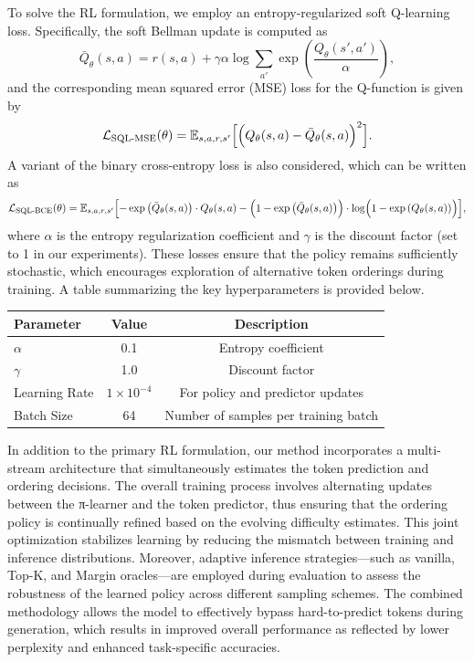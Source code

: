 \documentclass{article}
\begin{document}
To solve the RL formulation, we employ an entropy-regularized soft Q-learning loss. Specifically, the soft Bellman update is computed as
\[
\bar{Q}_\theta(s, a) = r(s, a) + \gamma \alpha \log \sum_{a'} \exp\left(\frac{Q_\theta(s',a')}{\alpha}\right),
\]
and the corresponding mean squared error (MSE) loss for the Q-function is given by
\[
\mathcal{L}_{\text{SQL-MSE}}(\theta) = \mathbb{E}_{s,a,r,s'} \Bigl[\Bigl(Q_\theta(s,a) - \bar{Q}_\theta(s,a)\Bigr)^2\Bigr].
\]
A variant of the binary cross-entropy loss is also considered, which can be written as
\[
\mathcal{L}_{\text{SQL-BCE}}(\theta) = \mathbb{E}_{s,a,r,s'} \Bigl[-\exp\left(\bar{Q}_\theta(s,a)\right) \cdot Q_\theta(s,a) - \Bigl(1 - \exp\left(\bar{Q}_\theta(s,a)\right)\Bigr) \cdot \log\Bigl(1 - \exp\left(Q_\theta(s,a)\right)\Bigr)\Bigr],
\]
where \( \alpha \) is the entropy regularization coefficient and \( \gamma \) is the discount factor (set to 1 in our experiments). These losses ensure that the policy remains sufficiently stochastic, which encourages exploration of alternative token orderings during training. A table summarizing the key hyperparameters is provided below.

\begin{center}
\begin{tabular}{lcc}
\hline
Parameter & Value & Description \\
\hline
\( \alpha \) & 0.1 & Entropy coefficient \\
\( \gamma \) & 1.0 & Discount factor \\
Learning Rate & \( 1 \times 10^{-4} \) & For policy and predictor updates \\
Batch Size & 64 & Number of samples per training batch \\
\hline
\end{tabular}
\end{center}

In addition to the primary RL formulation, our method incorporates a multi-stream architecture that simultaneously estimates the token prediction and ordering decisions. The overall training process involves alternating updates between the π-learner and the token predictor, thus ensuring that the ordering policy is continually refined based on the evolving difficulty estimates. This joint optimization stabilizes learning by reducing the mismatch between training and inference distributions. Moreover, adaptive inference strategies—such as vanilla, Top-K, and Margin oracles—are employed during evaluation to assess the robustness of the learned policy across different sampling schemes. The combined methodology allows the model to effectively bypass hard-to-predict tokens during generation, which results in improved overall performance as reflected by lower perplexity and enhanced task-specific accuracies.
\end{document}
